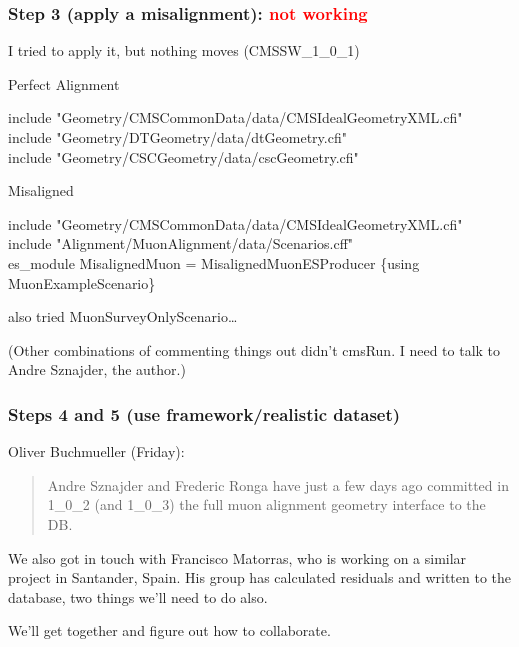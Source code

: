 \documentclass[12pt,compress]{beamer}
\begin{document}
\begin{frame}
\frametitle{Step 3 (apply a misalignment): \textcolor{red}{not working}}
I tried to apply it, but nothing moves (CMSSW\_1\_0\_1)

\vfill
\begin{description}
  \item[Perfect Alignment]
\end{description}

\begin{minipage}{\linewidth}
  \begin{flushleft}
    \scriptsize
    include "Geometry/CMSCommonData/data/CMSIdealGeometryXML.cfi" \\
    include "Geometry/DTGeometry/data/dtGeometry.cfi" \\
    include "Geometry/CSCGeometry/data/cscGeometry.cfi"
  \end{flushleft}
\end{minipage}

\begin{description}
  \item[Misaligned]
\end{description}

\begin{minipage}{\linewidth}
  \begin{flushleft}
    \scriptsize
    include "Geometry/CMSCommonData/data/CMSIdealGeometryXML.cfi" \\
    include "Alignment/MuonAlignment/data/Scenarios.cff" \\
    es\_module MisalignedMuon = MisalignedMuonESProducer \{using \\
    \hfill MuonExampleScenario\}
  \end{flushleft}
\end{minipage}

\hfill {\scriptsize also tried MuonSurveyOnlyScenario\ldots}

\vfill (Other combinations of commenting things out didn't cmsRun.  I
need to talk to Andre Sznajder, the author.)
\end{frame}

\begin{frame}
\frametitle{Steps 4 and 5 (use framework/realistic dataset)}
Oliver Buchmueller (Friday):
\begin{quote}
Andre Sznajder and Frederic Ronga have just a few days ago committed
in 1\_0\_2 (and 1\_0\_3) the full muon alignment geometry interface to
the DB.
\end{quote}

\vfill We also got in touch with Francisco Matorras, who is working on
a similar project in Santander, Spain.  His group has calculated
residuals and written to the database, two things we'll need to do also.

\vfill
We'll get together and figure out how to collaborate.
\end{frame}
\end{document}
